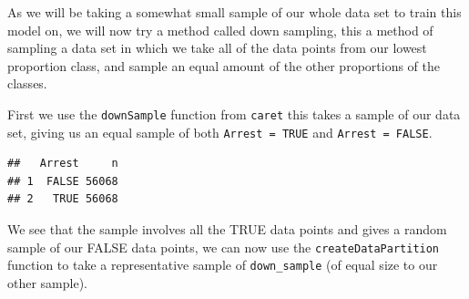\documentclass[
]{article}
\newenvironment{Shaded}{\begin{snugshade}}{\end{snugshade}}
\newcommand{\AttributeTok}[1]{\textcolor[rgb]{0.77,0.63,0.00}{#1}}
\newcommand{\ConstantTok}[1]{\textcolor[rgb]{0.00,0.00,0.00}{#1}}
\newcommand{\FunctionTok}[1]{\textcolor[rgb]{0.00,0.00,0.00}{#1}}
\newcommand{\NormalTok}[1]{#1}
\newcommand{\OtherTok}[1]{\textcolor[rgb]{0.56,0.35,0.01}{#1}}
\newcommand{\SpecialCharTok}[1]{\textcolor[rgb]{0.00,0.00,0.00}{#1}}
\begin{document}
As we will be taking a somewhat small sample of our whole data set to
train this model on, we will now try a method called down sampling, this
a method of sampling a data set in which we take all of the data points
from our lowest proportion class, and sample an equal amount of the
other proportions of the classes.

First we use the \texttt{downSample} function from \texttt{caret} this
takes a sample of our data set, giving us an equal sample of both
\texttt{Arrest\ =\ TRUE} and \texttt{Arrest\ =\ FALSE}.

\begin{Shaded}
\end{Shaded}

\begin{verbatim}
##   Arrest     n
## 1  FALSE 56068
## 2   TRUE 56068
\end{verbatim}

We see that the sample involves all the TRUE data points and gives a
random sample of our FALSE data points, we can now use the
\texttt{createDataPartition} function to take a representative sample of
\texttt{down\_sample} (of equal size to our other sample).

\begin{Shaded}
\end{Shaded}
\end{document}
